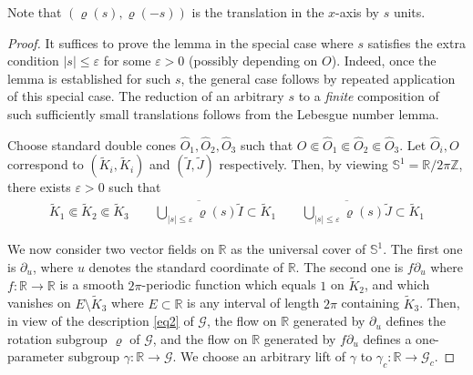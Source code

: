 \documentclass[11pt,b5paper,notitlepage]{article}
\theoremstyle{definition}
\theoremstyle{plain}
\newcommand{\wtd}{\widetilde}
\newcommand{\wht}{\widehat}
\newcommand{\ovl}{\overline}
\newcommand{\Zbb}{\mathbb Z}
\newcommand{\Rbb}{\mathbb R}
\newcommand{\Sbb}{{\mathbb S}}
\newcommand{\Gc}{\mathscr G_c}
\newcommand{\eps}{\varepsilon}
\newcommand{\SG}{\mathscr G}
\numberwithin{equation}{section}
\begin{document}
Note that $(\varrho(s),\varrho(-s))$ is the translation in the $x$-axis by $s$ units.

\begin{proof}
It suffices to prove the lemma in the special case where $s$ satisfies the extra condition $|s|\leq\eps$ for some $\eps>0$ (possibly depending on $O$). Indeed, once the lemma is established for such $s$, the general case follows by repeated application of this special case. The reduction of an arbitrary $s$ to a \textit{finite} composition of such sufficiently small translations follows from the Lebesgue number lemma.


Choose standard double cones $\wht O_1,\wht O_2,\wht O_3$ such that $O\Subset\wht O_1\Subset\wht O_2\Subset\wht O_3$. Let $\wht O_i,O$ correspond to $(\wtd K_i,\wtd K_i)$ and $(\wtd I,\wtd J)$ respectively. Then, by viewing $\Sbb^1=\Rbb/2\pi\Zbb$, there exists $\eps>0$ such that
\begin{align*}
\wtd K_1\Subset\wtd K_2\Subset\wtd K_3\qquad \ovl{\bigcup_{|s|\leq\eps}\varrho(s)\wtd I}\subset\wtd K_1\qquad \ovl{\bigcup_{|s|\leq\eps}\varrho(s)\wtd J}\subset\wtd K_1
\end{align*} 

We now consider two vector fields on $\Rbb$ as the universal cover of $\Sbb^1$. The first one is $\partial_u$, where $u$ denotes the standard coordinate of $\Rbb$. The second one is $f\partial_u$ where $f:\Rbb\rightarrow\Rbb$ is a smooth $2\pi$-periodic function which equals $1$ on $\wtd K_2$, and which vanishes on $E\setminus \wtd K_3$ where $E\subset\Rbb$ is any interval of length $2\pi$ containing $\wtd K_3$. Then, in view of the description \eqref{eq2} of $\SG$, the flow on $\Rbb$ generated by $\partial_u$ defines the rotation subgroup $\varrho$ of $\SG$, and the flow on $\Rbb$ generated by $f\partial_u$ defines a one-parameter subgroup $\gamma:\Rbb\rightarrow\SG$. We choose an arbitrary lift of $\gamma$ to $\gamma_c:\Rbb\rightarrow\Gc$.


\end{proof}
\end{document}
